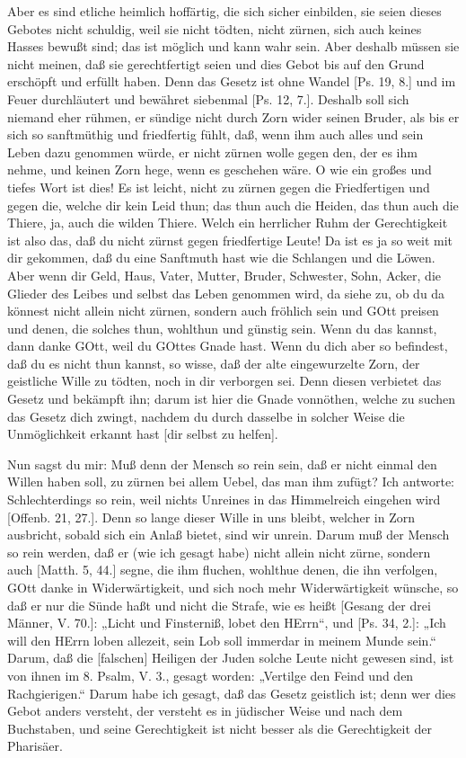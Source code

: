 Aber es sind etliche heimlich hoffärtig, die sich sicher einbilden, sie seien dieses Gebotes nicht schuldig, weil sie nicht tödten, nicht zürnen, sich auch keines Hasses bewußt sind; das ist möglich und kann wahr sein. Aber deshalb müssen sie nicht meinen, daß sie gerechtfertigt seien und dies Gebot bis auf den Grund erschöpft und erfüllt haben. Denn das Gesetz ist ohne Wandel [Ps. 19, 8.] und im Feuer durchläutert und bewähret siebenmal [Ps. 12, 7.]. Deshalb soll sich niemand eher rühmen, er sündige nicht durch Zorn wider seinen Bruder, als bis er sich so sanftmüthig und friedfertig fühlt, daß, wenn ihm auch alles und sein Leben dazu genommen würde, er nicht zürnen wolle gegen den, der es ihm nehme, und keinen Zorn hege, wenn es geschehen wäre. O wie ein großes und tiefes Wort ist dies! Es ist leicht, nicht zu zürnen gegen die Friedfertigen und gegen die, welche dir kein Leid thun; das thun auch die Heiden, das thun auch die Thiere, ja, auch die wilden Thiere. Welch ein herrlicher Ruhm der Gerechtigkeit ist also das, daß du nicht zürnst gegen friedfertige Leute! Da ist es ja so weit mit dir gekommen, daß du eine Sanftmuth hast wie die Schlangen und die Löwen. Aber wenn dir Geld, Haus, Vater, Mutter, Bruder, Schwester, Sohn, Acker, die Glieder des Leibes und selbst das Leben genommen wird, da siehe zu, ob du da könnest nicht allein nicht zürnen, sondern auch fröhlich sein und GOtt preisen und denen, die solches thun, wohlthun und günstig sein. Wenn du das kannst, dann danke GOtt, weil du GOttes Gnade hast. Wenn du dich aber so befindest, daß du es nicht thun kannst, so wisse, daß der alte eingewurzelte Zorn, der geistliche Wille zu tödten, noch in dir verborgen sei. Denn diesen verbietet das Gesetz und bekämpft ihn; darum ist hier die Gnade vonnöthen, welche zu suchen das Gesetz dich zwingt, nachdem du durch dasselbe in solcher Weise die Unmöglichkeit erkannt hast [dir selbst zu helfen].

Nun sagst du mir: Muß denn der Mensch so rein sein, daß er nicht einmal den Willen haben soll, zu zürnen bei allem Uebel, das man ihm zufügt? Ich antworte: Schlechterdings so rein, weil nichts Unreines in das Himmelreich eingehen wird [Offenb. 21, 27.]. Denn so lange dieser Wille in uns bleibt, welcher in Zorn ausbricht, sobald sich ein Anlaß bietet, sind wir unrein. Darum muß der Mensch so rein werden, daß er (wie ich gesagt habe) nicht allein nicht zürne, sondern auch [Matth. 5, 44.] segne, die ihm fluchen, wohlthue denen, die ihn verfolgen, GOtt danke in Widerwärtigkeit, und sich noch mehr Widerwärtigkeit wünsche, so daß er nur die Sünde haßt und nicht die Strafe, wie es heißt [Gesang der drei Männer, V. 70.]: „Licht und Finsterniß, lobet den HErrn“, und [Ps. 34, 2.]: „Ich will den HErrn loben allezeit, sein Lob soll immerdar in meinem Munde sein.“ Darum, daß die [falschen] Heiligen der Juden solche Leute nicht gewesen sind, ist von ihnen im 8. Psalm, V. 3., gesagt worden: „Vertilge den Feind und den Rachgierigen.“ Darum habe ich gesagt, daß das Gesetz geistlich ist; denn wer dies Gebot anders versteht, der versteht es in jüdischer Weise und nach dem Buchstaben, und seine Gerechtigkeit ist nicht besser als die Gerechtigkeit der Pharisäer.

